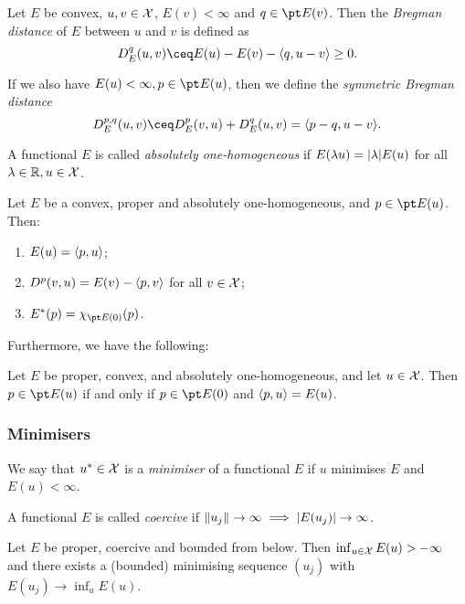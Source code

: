 \begin{definition}
	Let $E$ be convex, $u, v \in \mathcal X$, $E(v) < \infty$ and $q \in \pt E(v)$. Then the \emph{Bregman distance} of $E$ between $u$ and $v$ is defined as
	\[
	D_E^q(u, v) \ceq E(u) - E(v) - \ang{q, u -v} \geq 0. 
	\]
	
	If we also have $E(u) < \infty, p \in \pt E(u)$, then we define the \emph{symmetric Bregman distance}
	\[
	D_E^{p, q}(u, v) \ceq D_E^p(v, u) + D_E^q(u, v) = \ang{p - q, u - v}. 
	\]
\end{definition}

\begin{definition}
	A functional $E$ is called \emph{absolutely one-homogeneous} if $E(\lambda u) = \abs{\lambda} E(u)$ for all $\lambda \in \mathbb R, u \in \mathcal X$. 
\end{definition}

\begin{proposition}
	Let $E$ be a convex, proper and absolutely one-homogeneous, and $p \in \pt E(u)$. Then:
	\begin{enumerate}
		\item $E(u) = \langle p, u\rangle$;
		\item $D^p(v, u) = E(v) - \langle p, v\rangle$ for all $v \in \mathcal X$;
		\item $E^*(p) = \chi_{\pt E(0)}(p)$.
	\end{enumerate}  
\end{proposition}

Furthermore, we have the following:
\begin{proposition}
	Let $E$ be proper, convex, and absolutely one-homogeneous, and let $u \in \mathcal X$. Then $p \in \pt E(u)$ if and only if $p \in \pt E(0)$ and $\langle p, u\rangle = E(u)$. 
\end{proposition}

\subsubsection{Minimisers}
\begin{definition}
	We say that $u^* \in \mathcal X$ is a \emph{minimiser} of a  functional $E$ if $u$ minimises $E$ and $E(u) < \infty$. 
\end{definition}

\begin{definition}
	A functional $E$ is called \emph{coercive} if $\norm{u_j} \to \infty \implies \abs{E(u_j)} \to \infty$. 
\end{definition}

\begin{lemma}
	Let $E$ be proper, coercive and bounded from below. Then $\inf_{u \in \mathcal X} E(u) > -\infty$ and there exists a (bounded) minimising sequence $(u_j)$ with $E(u_j) \to \inf_u E(u)$. \end{lemma}

